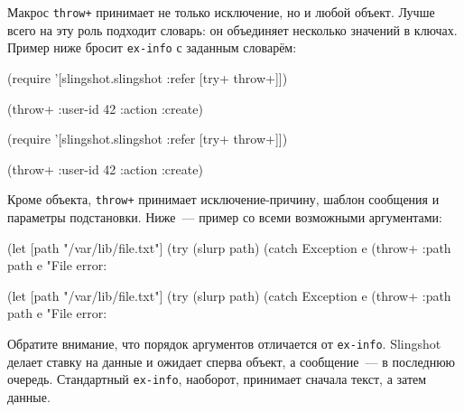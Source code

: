 Макрос \verb|throw+| принимает не только исключение, но и любой объект. Лучше
всего на эту роль подходит словарь: он объединяет несколько значений в
ключах. Пример ниже бросит \verb|ex-info| с заданным словарём:

\ifnarrow

\begin{english}
  \begin{clojure}
(require
  '[slingshot.slingshot
    :refer [try+ throw+]])

(throw+ {:user-id 42 :action :create})
  \end{clojure}
\end{english}

\else

\begin{english}
  \begin{clojure}
(require '[slingshot.slingshot :refer [try+ throw+]])

(throw+ {:user-id 42 :action :create})
  \end{clojure}
\end{english}

\fi

Кроме объекта, \verb|throw+| принимает исклю\-че\-ние-при\-чи\-ну, шаблон
сообщения и параметры подстановки. Ниже~--- пример со всеми возможными
аргументами:

\pagebreakafive[3]

\ifnarrow

\begin{english}
  \begin{clojure}
(let [path "/var/lib/file.txt"]
  (try
    (slurp path)
    (catch Exception e
      (throw+ {:path path} e
      "File error: %
  \end{clojure}
\end{english}

\else

\begin{english}
  \begin{clojure}
(let [path "/var/lib/file.txt"]
  (try
    (slurp path)
    (catch Exception e
      (throw+ {:path path} e "File error: %
  \end{clojure}
\end{english}

\fi

Обратите внимание, что порядок аргументов отличается от
\verb|ex-info|. Slingshot делает ставку на данные и ожидает сперва объект, а
сообщение~--- в последнюю очередь. Стандартный \verb|ex-info|, наоборот,
принимает сначала текст, а затем данные.

